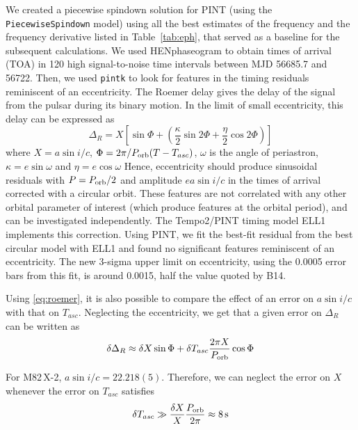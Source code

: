 \documentclass[twocolumn]{aastex631}
\newcommand{\Mtwo}{M82\,X-2\xspace}
\newcommand{\Porb}{\ensuremath{P_{\rm orb}}}
\begin{document}
We created a piecewise spindown solution for PINT (using the \texttt{PiecewiseSpindown} model) using all the best estimates of the frequency and the frequency derivative listed in Table~\ref{tab:eph}, that served as a baseline for the subsequent calculations.
We used HENphaseogram \citep{bachettiHENDRICSHighENergy2018} to obtain times of arrival (TOA) in 120 high signal-to-noise time intervals between MJD 56685.7 and 56722.
Then, we used \texttt{pintk} to look for features in the timing residuals reminiscent of an eccentricity.
The Roemer delay gives the delay of the signal from the pulsar during its binary motion.
In the limit of small eccentricity, this delay can be expressed as
\begin{equation}\label{eq:roemer}
    \Delta_R = X\left[\sin\Phi + \left(\frac{\kappa}{2}\sin 2\Phi + \frac{\eta}{2}\cos 2\Phi \right)\right]
\end{equation}
where $X=a\sin i/c$,  $\Phi=2\pi/\Porb(T-T_{asc})$, $\omega$ is the angle of periastron, $\kappa=e\sin\omega$ and $\eta=e\cos\omega$
Hence, eccentricity should produce sinusoidal residuals with $P=\Porb/2$ and amplitude $e a\sin i/c$ in the times of arrival corrected with a circular orbit.
These features are not correlated with any other orbital parameter of interest (which produce features at the orbital period), and can be investigated independently.
The Tempo2/PINT timing model ELL1  \citep{langePrecisionTimingMeasurements2001} implements this correction.
Using PINT, we fit the best-fit residual from the best circular model with ELL1 and found no significant features reminiscent of an eccentricity.
The new 3-sigma upper limit on eccentricity, using the 0.0005 error bars from this fit, is around 0.0015, half the value quoted by B14.

Using \eqref{eq:roemer}, it is also possible to compare the effect of an error on $a\sin i/c$ with that on $T_{asc}$.
Neglecting the eccentricity, we get that a given error on $\Delta_R$ can be written as
\begin{equation}\label{eq:roemererr}
\delta\Delta_R \approx \delta X \sin \Phi + \delta T_{asc} \frac{2\pi X}{\Porb} \cos{\Phi}
\end{equation}

For \Mtwo, $a\sin i/c=22.218(5)$. Therefore, we can neglect the error on $X$ whenever the error on $T_{asc}$ satisfies
\begin{equation}
    \delta T_{asc} \gg \frac{\delta X}{X} \frac{\Porb}{2\pi} \approx \mathrm{8\,s}
\end{equation}
\end{document}
